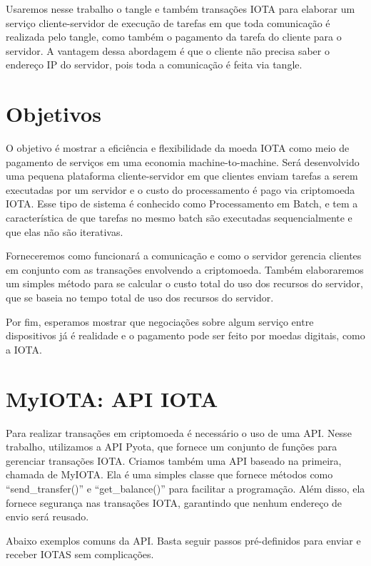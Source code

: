 \documentclass[a4paper]{article}
\begin{document}
Usaremos nesse trabalho o tangle e também transações IOTA para elaborar um serviço cliente-servidor de execução de tarefas
em que toda comunicação é realizada pelo tangle, como também o pagamento da tarefa do cliente para o servidor. A vantagem dessa
abordagem é que o cliente não precisa saber o endereço IP do servidor, pois toda a comunicação é feita via tangle.

\section{Objetivos}\label{sec:Goals}

O objetivo é mostrar a eficiência e flexibilidade da moeda IOTA como meio de pagamento de serviços em uma economia
machine-to-machine. Será desenvolvido uma pequena plataforma cliente-servidor em que clientes enviam tarefas a serem
executadas por um servidor e o custo do processamento é pago via criptomoeda IOTA. Esse tipo de sistema é conhecido
como Processamento em Batch, e tem a característica de que tarefas no mesmo batch são executadas sequencialmente e que
elas não são iterativas.

Forneceremos como funcionará a comunicação e como o servidor gerencia clientes em conjunto
com as transações envolvendo a criptomoeda. Também elaboraremos um simples método para se calcular o custo total
do uso dos recursos do servidor, que se baseia no tempo total de uso dos recursos do servidor.

Por fim, esperamos mostrar que negociações sobre algum serviço entre dispositivos já é realidade e o pagamento pode ser feito
por moedas digitais, como a IOTA.

\section{MyIOTA: API IOTA}

Para realizar transações em criptomoeda é necessário o uso de uma API. Nesse trabalho, utilizamos a API Pyota, que fornece um conjunto
de funções para gerenciar transações IOTA. Criamos também uma API baseado na primeira, chamada de MyIOTA. Ela é uma simples classe
que fornece métodos como ``send\_transfer()'' e ``get\_balance()'' para facilitar a programação. Além disso, ela fornece segurança
nas transações IOTA, garantindo que nenhum endereço de envio será reusado.

Abaixo exemplos comuns da API. Basta seguir passos pré-definidos para enviar e receber IOTAS sem complicações.
\end{document}
